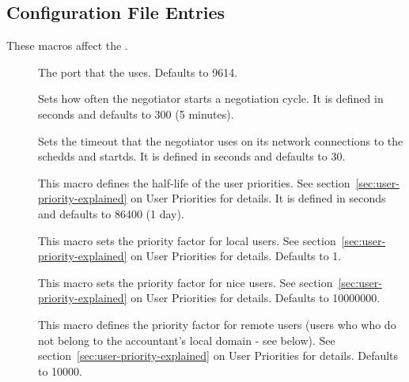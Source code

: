 \subsection{\label{sec:Negotiator-Config-File-Entries}
 Configuration File Entries}

These macros affect the .
\begin{description}
  
\item[] \label{param:NegotiatorPort}
  The port that the  uses. Defaults to 9614.

\item[] \label{param:NegotiatorInterval}
  Sets how often the negotiator starts a negotiation cycle.  It is defined
  in seconds and defaults to 300 (5 minutes).
  
\item[] \label{param:NegotiatorTimeout}
  Sets the timeout that the negotiator uses on its network connections
  to the schedds and startds.  It is defined in seconds and defaults to 30.
  
\item[] \label{param:PriorityHalfLife} This
  macro defines the half-life of the user priorities.  See
  section~\ref{sec:user-priority-explained}
  on User Priorities for details.  It is defined in seconds and defaults
  to 86400 (1 day).

\item[] \label{param:DefaultPrioFactor} 
  This macro sets the priority factor for local users. See
  section~\ref{sec:user-priority-explained}
  on User Priorities for details.  Defaults to 1.

\item[] \label{param:NiceUserPrioFactor} 
  This macro sets the priority factor for nice users. See
  section~\ref{sec:user-priority-explained}
  on User Priorities for details.  Defaults to 10000000.

\item[] \label{param:RemotePrioFactor} 
  This macro defines the priority factor for remote users (users who
  who do not belong to the accountant's local domain - see
  below). See section~\ref{sec:user-priority-explained}
  on User Priorities for details.  Defaults to 10000.


\end{description}
